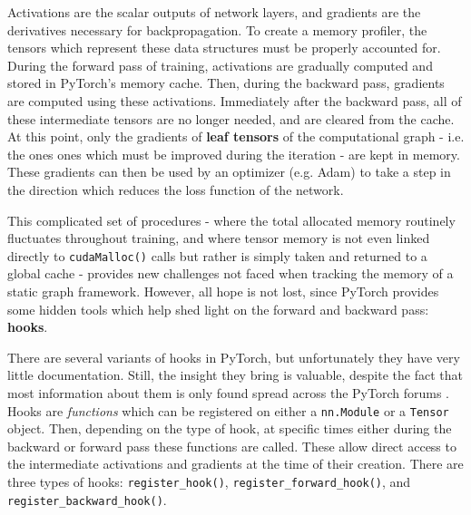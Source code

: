 \documentclass[12pt,letterpaper]{article}
\begin{document}
Activations are the scalar outputs of network layers, and gradients are the derivatives necessary for backpropagation. To create a memory profiler, the tensors which represent these data structures must be properly accounted for. During the forward pass of training, activations are gradually computed and stored in PyTorch's memory cache. Then, during the backward pass, gradients are computed using these activations. Immediately after the backward pass, all of these intermediate tensors are no longer needed, and are cleared from the cache. At this point, only the gradients of \textbf{leaf tensors} \cite{pytorch_doc_leaf_requires_grad} of the computational graph - i.e. the ones ones which must be improved during the iteration - are kept in memory. These gradients can then be used by an optimizer (e.g. Adam) to take a step in the direction which reduces the loss function of the network.
\par 

This complicated set of procedures - where the total allocated memory routinely fluctuates throughout training, and where tensor memory is not even linked directly to \texttt{cudaMalloc()} calls but rather is simply taken and returned to a global cache - provides new challenges not faced when tracking the memory of a static graph framework. However, all hope is not lost, since PyTorch provides some hidden tools which help shed light on the forward and backward pass: \textbf{hooks}.
\par 

There are several variants of hooks in PyTorch, but unfortunately they have very little documentation. Still, the insight they bring is valuable, despite the fact that most information about them is only found spread across the PyTorch forums \cite{pytorch_forum}. Hooks are \textit{functions} which can be registered on either a \texttt{nn.Module} or a \texttt{Tensor} object. Then, depending on the type of hook, at specific times either during the backward or forward pass these functions are called. These allow direct access to the intermediate activations and gradients at the time of their creation. There are three types of hooks: \texttt{register\_hook()}, \texttt{register\_forward\_hook()}, and \texttt{register\_backward\_hook()}. %
\par 
\end{document}

